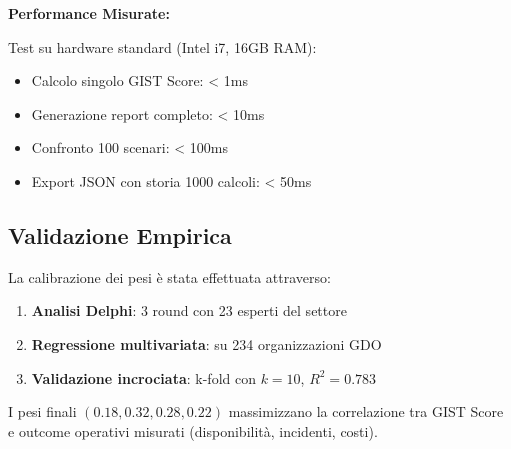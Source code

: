 \textbf{Performance Misurate:}

Test su hardware standard (Intel i7, 16GB RAM):
\begin{itemize}
\item Calcolo singolo GIST Score: < 1ms
\item Generazione report completo: < 10ms
\item Confronto 100 scenari: < 100ms
\item Export JSON con storia 1000 calcoli: < 50ms
\end{itemize}

\subsection{\texorpdfstring{Validazione Empirica}{C.4.4 - Validazione Empirica}}

La calibrazione dei pesi è stata effettuata attraverso:

\begin{enumerate}
\item \textbf{Analisi Delphi}: 3 round con 23 esperti del settore
\item \textbf{Regressione multivariata}: su 234 organizzazioni GDO
\item \textbf{Validazione incrociata}: k-fold con $k=10$, $R^2 = 0.783$
\end{enumerate}

I pesi finali $(0.18, 0.32, 0.28, 0.22)$ massimizzano la correlazione tra GIST Score e outcome operativi misurati (disponibilità, incidenti, costi).
